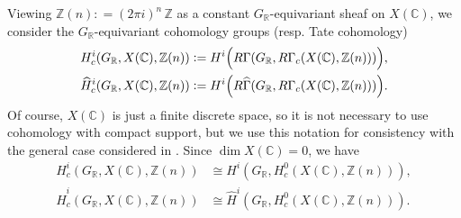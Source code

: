 \documentclass[draft]{article}
\newcommand{\CC}{\mathbb{C}}
\newcommand{\RR}{\mathbb{R}}
\newcommand{\ZZ}{\mathbb{Z}}
\newcommand{\dfn}{\mathrel{\mathop:}=}
\theoremstyle{myplain}
\theoremstyle{mydefinition}
\begin{document}
Viewing $\ZZ (n) \dfn (2\pi i)^n\,\ZZ$ as a constant $G_\RR$-equivariant sheaf
on $X(\CC)$, we consider the $G_\RR$-equivariant cohomology groups (resp. Tate
cohomology)
\begin{align*}
  H^i_c (G_\RR, X(\CC), \ZZ(n)) & \dfn H^i \Bigl(R\Gamma (G_\RR, R\Gamma_c (X(\CC), \ZZ(n)))\Bigr), \\
  \widehat{H}^i_c (G_\RR, X(\CC), \ZZ(n)) & \dfn H^i \Bigl(R\widehat{\Gamma} (G_\RR, R\Gamma_c (X(\CC), \ZZ(n)))\Bigr).
\end{align*}
Of course, $X(\CC)$ is just a finite discrete space, so it is not necessary to
use cohomology with compact support, but we use this notation for consistency
with the general case considered in \cite{Beshenov-Weil-etale-1}. Since
$\dim X(\CC) = 0$, we have
\begin{align*}
  H^i_c (G_\RR, X(\CC), \ZZ(n)) & \cong H^i (G_\RR, H^0_c (X(\CC), \ZZ(n))), \\
  \widehat{H}^i_c (G_\RR, X(\CC), \ZZ(n)) & \cong \widehat{H}^i (G_\RR, H^0_c (X(\CC), \ZZ(n))).
\end{align*}
\end{document}
